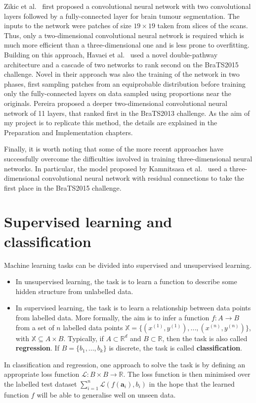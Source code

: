 \documentclass[12pt,a4paper,twoside,openright]{report}
\begin{document}
Zikic et al.\ \cite{zikic} first proposed a convolutional neural network with two convolutional layers followed by a fully-connected layer for brain tumour segmentation. The inputs to the network were patches of size $19 \times 19$ taken from slices of the scans. Thus, only a two-dimensional convolutional neural network is required which is much more efficient than a three-dimensional one and is less prone to overfitting. Building on this approach, Havaei et al.\ \cite{havaei} used a novel double-pathway architecture and a cascade of two networks to rank second on the BraTS2015 challenge. Novel in their approach was also the training of the network in two phases, first sampling patches from an equiprobable distribution before training only the fully-connected layers on data sampled using proportions near the originals. Pereira \cite{pereira} proposed a deeper two-dimensional convolutional neural network of 11 layers, that ranked first in the BraTS2013 challenge. As the aim of my project is to replicate this method, the details are explained in the Preparation and Implementation chapters. 

Finally, it is worth noting that some of the more recent approaches have successfully overcome the difficulties involved in training three-dimensional neural networks. In particular, the model proposed by Kamnitsasa et al.\ \cite{kamnitas} used a three-dimensional convolutional neural network with residual connections \cite{resnet} to take the first place in the BraTS2015 challenge.

\section{Supervised learning and classification}
Machine learning tasks can be divided into supervised and unsupervised learning.
\begin{itemize}
	\item In unsupervised learning, the task is to learn a function to describe some hidden structure from unlabelled data. 
	\item In supervised learning, the task is to learn a relationship between data points from labelled data. More formally, the aim is to infer a function $f: A \to B$ from a set of $n$ labelled data points $\mathbb{X} = \{(x^{(1)}, y^{(1)}), ..., (x^{(n)}, y^{(n)})\}$, with $\mathbb{X} \subseteq A \times B$. Typically, if $A \subset \mathbb{R}^d$ and $B \subset \mathbb{R}$, then the task is also called \textbf{regression}. If $B = \{b_1, ..., b_k\}$ is discrete, the task is called \textbf{classification}. 
\end{itemize} 
In classification and regression, one approach to solve the task is by defining an appropriate loss function $\mathcal{L}: B \times B \to \mathbb{R}$. The loss function is then minimised over the labelled test dataset $\sum_{i=1}^n \mathcal{L}(f(\textbf{a}_i), b_i)$ in the hope that the learned function $f$ will be able to generalise well on unseen data.
\end{document}
